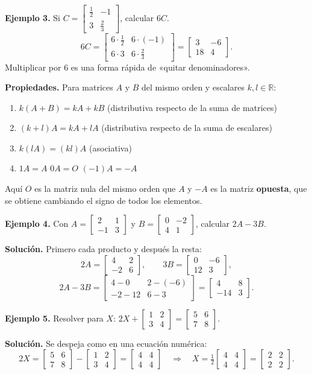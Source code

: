 \documentclass[12pt, letterpaper]{article}
\newcommand{\mwmat}[1]{\ensuremath{\begin{bmatrix}#1\end{bmatrix}}}
\begin{document}
\begin{cuadrosolucion}
  \small
  \textbf{Ejemplo 3.} Si $C=\mwmat{\tfrac12 & -1\\[2pt] 3 & \tfrac23}$,
  calcular $6C$.
  \[
    6C=\mwmat{6\cdot\tfrac12 & 6\cdot(-1)\\[2pt] 6\cdot3 & 6\cdot\tfrac23}
    =\mwmat{3 & -6\\ 18 & 4}.
  \]
  Multiplicar por $6$ es una forma rápida de «quitar denominadores».
\end{cuadrosolucion}

\begin{cuadroteoria}
  \small
  \textbf{Propiedades.} Para matrices $A$ y $B$ del mismo orden y escalares
  $k,l\in\mathbb{R}$:
  \begin{enumerate}[leftmargin=1.4em, nosep]
    \item $k(A+B)=kA+kB$ \quad (distributiva respecto de la suma de matrices)
    \item $(k+l)A=kA+lA$ \quad (distributiva respecto de la suma de escalares)
    \item $k(lA)=(kl)A$ \quad (asociativa)
    \item $1A=A$ \qquad $0A=O$ \qquad $(-1)A=-A$
  \end{enumerate}
  Aquí $O$ es la matriz nula del mismo orden que $A$ y $-A$ es la matriz
  \textbf{opuesta}, que se obtiene cambiando el signo de todos los elementos.
\end{cuadroteoria}

\begin{cuadrosolucion}
  \small
  \textbf{Ejemplo 4.} Con $A=\mwmat{2&1\\-1&3}$ y $B=\mwmat{0&-2\\4&1}$,
  calcular $2A-3B$.

  \medskip
  \textbf{Solución.} Primero cada producto y después la resta:
  \[
    2A=\mwmat{4&2\\-2&6},\qquad
    3B=\mwmat{0&-6\\12&3},
  \]
  \[
    2A-3B=\mwmat{4-0 & 2-(-6)\\-2-12 & 6-3}
    =\mwmat{4 & 8\\ -14 & 3}.
  \]
\end{cuadrosolucion}

\begin{cuadrosolucion}
  \small
  \textbf{Ejemplo 5.} Resolver para $X$:
  $2X+\mwmat{1&2\\3&4}=\mwmat{5&6\\7&8}$.

  \medskip
  \textbf{Solución.} Se despeja como en una ecuación numérica:
  \[
    2X=\mwmat{5&6\\7&8}-\mwmat{1&2\\3&4}
      =\mwmat{4&4\\4&4}
    \quad\Rightarrow\quad
    X=\tfrac12\mwmat{4&4\\4&4}=\mwmat{2&2\\2&2}.
  \]
\end{cuadrosolucion}
\end{document}
